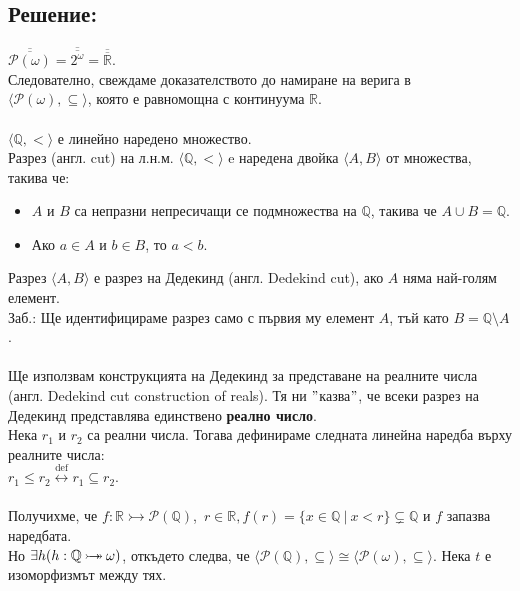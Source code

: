 \documentclass[french]{article}
\begin{document}
   	\subsection*{Решение:}
   	$\overline{\overline{\mathcal{P}(\omega)}} = \overline{\overline{2^\omega}} = \overline{\overline{\mathbb{R}}}$. \\
   	Следователно, свеждаме доказателството до намиране на верига в \\
   	$\langle \mathcal{P}(\omega), \subseteq \rangle$, която е равномощна с континуума $\mathbb{R}$. \\
   	\\
   	$\langle \mathbb{Q}, < \rangle$ е линейно наредено множество. \\
   	Разрез (англ. cut) на л.н.м. $\langle \mathbb{Q}, < \rangle$ e наредена двойка $\langle A, B \rangle$ от множества, такива че:
   	\begin{itemize}
   		\item $A$ и $B$ са непразни непресичащи се подмножества на $\mathbb{Q}$, такива че $A \cup B = \mathbb{Q}$.
   		\item Ако $a \in A$ и $b \in B$, то $a < b$.
   	\end{itemize}
    Разрез $\langle A, B \rangle$ е разрез на Дедекинд (англ. Dedekind cut), ако $A$ няма най-голям елемент. \\
    Заб.: Ще идентифицираме разрез само с първия му елемент $A$, тъй като $B = \mathbb{Q} \setminus A$. \\
    \\
    Ще използвам конструкцията на Дедекинд за представане на реалните числа (англ. Dedekind cut construction of reals). Тя ни $"$казва$"$, че всеки разрез на Дедекинд представлява единствено \textbf{реално число}. \\
    Нека $r_1$ и $r_2$ са реални числа. Тогава дефинираме следната линейна наредба върху реалните числа: \\
    $r_1 \le r_2 \stackrel{\mathrm{def}}{\longleftrightarrow} r_1 \subseteq r_2$. \\
    \\
    Получихме, че $f : \mathbb{R} \rightarrowtail \mathcal{P}(\mathbb{Q})$,\ $r \in \mathbb{R}, f(r) = \{x \in \mathbb{Q}\ |\ x < r\} \subsetneq \mathbb{Q}$ и $f$ запазва наредбата. \\
    Но $\exists h(h : \mathbb{Q} \mathbin{\rightarrowtail \hspace{-8pt} \twoheadrightarrow} \mathbb{\omega})$, откъдето следва, че $\langle \mathcal{P}(\mathbb{Q}), \subseteq \rangle \cong \langle \mathcal{P}(\mathbb{\omega}), \subseteq \rangle$. Нека $t$ е изоморфизмът между тях. \\
\end{document}
